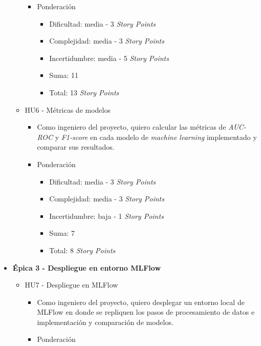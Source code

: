 \documentclass[
11pt, %
]{charter}
\begin{document}
\begin{itemize}
\begin{itemize}
\begin{itemize}
            \item Ponderación
            \begin{itemize}
                \item Dificultad: media - 3 \textit{Story Points}
                \item Complejidad: media - 3 \textit{Story Points}
                \item Incertidumbre: media - 5 \textit{Story Points}
                \item Suma: 11
                \item Total: 13 \textit{Story Points}
            \end{itemize}
        \end{itemize}
      \item HU6 - Métricas de modelos
        \begin{itemize}
            \item Como ingeniero del proyecto, quiero calcular las métricas de \textit{AUC-ROC} y \textit{F1-score} en cada modelo de \textit{machine learning} implementado y comparar sus resultados.
            \item Ponderación
            \begin{itemize}
                \item Dificultad: media - 3 \textit{Story Points}
                \item Complejidad: media - 3 \textit{Story Points}
                \item Incertidumbre: baja - 1 \textit{Story Points}
                \item Suma: 7
                \item Total: 8 \textit{Story Points}
            \end{itemize}
        \end{itemize}
    \end{itemize}
\newpage    
  \item \textbf{\'{E}pica 3 - Despliegue en entorno MLFlow}
    \begin{itemize}
      \item HU7 - Despliegue en MLFlow
        \begin{itemize}
            \item Como ingeniero del proyecto, quiero desplegar un entorno local de MLFlow en donde se repliquen los pasos de procesamiento de datos e implementación y comparación de modelos.
            \item Ponderación
            \begin{itemize}

\end{itemize}
\end{itemize}
\end{itemize}
\end{itemize}
\end{document}
